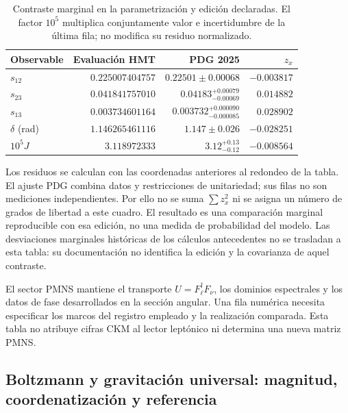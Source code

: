 \begin{table}[htbp]
\centering\small
\setlength{\tabcolsep}{4pt}
\begin{tabular}{@{}lrrr@{}}
\toprule
Observable & Evaluación HMT & PDG 2025 & \(z_x\)\\
\midrule
\(s_{12}\) & \(0.225007404757\) & \(0.22501\pm0.00068\) & \(-0.003817\)\\
\(s_{23}\) & \(0.041841757010\) & \(0.04183^{+0.00079}_{-0.00069}\) & \(0.014882\)\\
\(s_{13}\) & \(0.003734601164\) & \(0.003732^{+0.000090}_{-0.000085}\) & \(0.028902\)\\
\(\delta\) (rad) & \(1.146265461116\) & \(1.147\pm0.026\) & \(-0.028251\)\\
\(10^5J\) & \(3.118972333\) & \(3.12^{+0.13}_{-0.12}\) & \(-0.008564\)\\
\bottomrule
\end{tabular}
\caption{Contraste marginal en la parametrización y edición declaradas.
El factor \(10^5\) multiplica conjuntamente valor e incertidumbre de la
última fila; no modifica su residuo normalizado.}
\label{tab:ii-ckm-comparacion}
\end{table}

Los residuos se calculan con las coordenadas anteriores al redondeo
de la tabla. El ajuste PDG combina datos y restricciones de unitariedad;
sus filas no son mediciones independientes. Por ello no se suma
\(\sum z_x^2\) ni se asigna un número de grados de libertad a este cuadro.
El resultado es una comparación marginal reproducible con esa edición,
no una medida de probabilidad del modelo. Las desviaciones marginales
históricas de los cálculos antecedentes no se trasladan a esta tabla:
su documentación no identifica la edición y la covarianza de aquel contraste.

El sector PMNS mantiene el transporte \(U=F_\ell^\dagger F_\nu\), los
dominios espectrales y los datos de fase desarrollados en la sección
angular. Una fila numérica necesita especificar los marcos del registro
empleado y la realización comparada. Esta tabla no atribuye cifras CKM
al lector leptónico ni determina una nueva matriz PMNS.

\subsection{Boltzmann y gravitación universal: magnitud, coordenatización y referencia}

